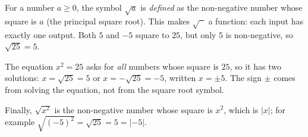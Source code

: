 For a number $a\ge0$, the symbol $\sqrt a$ is \emph{defined} as the non-negative number whose square is $a$ (the principal square root). This makes $\sqrt{\phantom{a}}$ a function: each input has exactly one output. Both $5$ and $-5$ square to $25$, but only $5$ is non-negative, so $\sqrt{25}=\boxed{5}$.

The equation $x^2=25$ asks for \emph{all} numbers whose square is $25$, so it has two solutions: $x=\sqrt{25}=5$ or $x=-\sqrt{25}=-5$, written $\boxed{x=\pm5}$. The sign $\pm$ comes from solving the equation, not from the square root symbol.

Finally, $\sqrt{x^2}$ is the non-negative number whose square is $x^2$, which is $\boxed{|x|}$; for example $\sqrt{(-5)^2}=\sqrt{25}=5=|-5|$.
